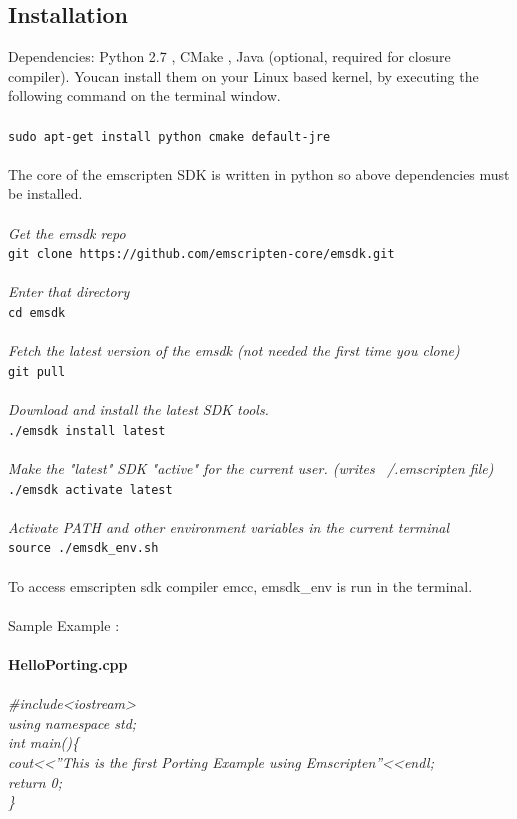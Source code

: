 \documentclass[12pt]{article}
\begin{document}
\subsection{Installation}
Dependencies: Python 2.7 , CMake , Java (optional, required for closure compiler). Youcan install them on your Linux based kernel, by executing the following command on the terminal window.
\\ \\
\texttt{sudo apt-get install python cmake default-jre} \\ \\
The core of the emscripten SDK is written in python so above dependencies must be installed.
\\
\\
\emph{Get the emsdk repo}\\
\texttt{git clone https://github.com/emscripten-core/emsdk.git}
\\
\\
\emph{Enter that directory}\\
\texttt{cd emsdk}
\\
\\
\emph{Fetch the latest version of the emsdk (not needed the first time you clone)}\\
\texttt{git pull}
\\
\\
\emph{Download and install the latest SDK tools.}\\
\texttt{./emsdk install latest}
\\
\\
\emph{Make the "latest" SDK "active" for the current user. (writes ~/.emscripten file)}\\
\texttt{./emsdk activate latest}
\\
\\
\emph{Activate PATH and other environment variables in the current terminal}\\
\texttt{source ./emsdk\_{}env.sh}
\\
\\
To access emscripten sdk compiler emcc, emsdk\_env is run in the terminal.
\\ \\
Sample Example :\\ \\
\textbf{HelloPorting.cpp}\\ \\
\textsl{\#include\textless iostream\textgreater\\
using namespace std;\\
int main()\{ \\
	cout\textless\textless”This is the first Porting Example using Emscripten”\textless\textless endl;\\
	return 0;\\
\}}
\end{document}
